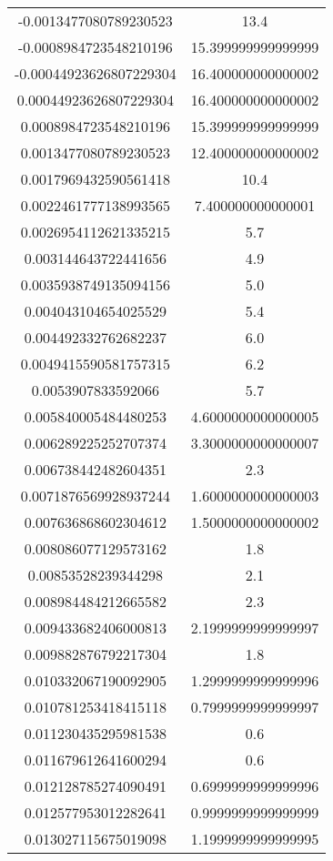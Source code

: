 \begin{table}
\begin{tabular}{S[]S[]}
-0.0013477080789230523 & 13.4\\
-0.0008984723548210196 & 15.399999999999999\\
-0.00044923626807229304 & 16.400000000000002\\
0.00044923626807229304 & 16.400000000000002\\
0.0008984723548210196 & 15.399999999999999\\
0.0013477080789230523 & 12.400000000000002\\
0.0017969432590561418 & 10.4\\
0.0022461777138993565 & 7.400000000000001\\
0.0026954112621335215 & 5.7\\
0.003144643722441656 & 4.9\\
0.0035938749135094156 & 5.0\\
0.004043104654025529 & 5.4\\
0.004492332762682237 & 6.0\\
0.0049415590581757315 & 6.2\\
0.0053907833592066 & 5.7\\
0.005840005484480253 & 4.6000000000000005\\
0.006289225252707374 & 3.3000000000000007\\
0.006738442482604351 & 2.3\\
0.0071876569928937244 & 1.6000000000000003\\
0.007636868602304612 & 1.5000000000000002\\
0.008086077129573162 & 1.8\\
0.00853528239344298 & 2.1\\
0.008984484212665582 & 2.3\\
0.009433682406000813 & 2.1999999999999997\\
0.009882876792217304 & 1.8\\
0.010332067190092905 & 1.2999999999999996\\
0.010781253418415118 & 0.7999999999999997\\
0.011230435295981538 & 0.6\\
0.011679612641600294 & 0.6\\
0.012128785274090491 & 0.6999999999999996\\
0.012577953012282641 & 0.9999999999999999\\
0.013027115675019098 & 1.1999999999999995\\
\bottomrule
\end{tabular}\end{table}
